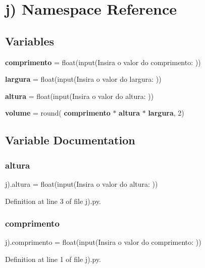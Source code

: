 \section{j) Namespace Reference}
\label{namespacej_08}
\subsection*{Variables}
\begin{DoxyCompactItemize}
\item 
\textbf{ comprimento} = float(input(\textquotesingle{}Insira o valor do comprimento\+: \textquotesingle{}))
\item 
\textbf{ largura} = float(input(\textquotesingle{}Insira o valor do largura\+: \textquotesingle{}))
\item 
\textbf{ altura} = float(input(\textquotesingle{}Insira o valor do altura\+: \textquotesingle{}))
\item 
\textbf{ volume} = round(\textbf{ comprimento} $\ast$ \textbf{ altura} $\ast$ \textbf{ largura}, 2)
\end{DoxyCompactItemize}


\subsection{Variable Documentation}
\mbox{\label{namespacej_08_a4e92fe25f68f6345d501c20aaefdc18d}} 
\subsubsection{altura}
{\footnotesize\ttfamily j).altura = float(input(\textquotesingle{}Insira o valor do altura\+: \textquotesingle{}))}



Definition at line 3 of file j).\+py.

\mbox{\label{namespacej_08_ae21a412e3c438be7ce5e15002a2bc7d1}} 
\subsubsection{comprimento}
{\footnotesize\ttfamily j).comprimento = float(input(\textquotesingle{}Insira o valor do comprimento\+: \textquotesingle{}))}



Definition at line 1 of file j).\+py.

\mbox{\label{namespacej_08_ad51d738c4437097715cabf750541c6f5}} 
